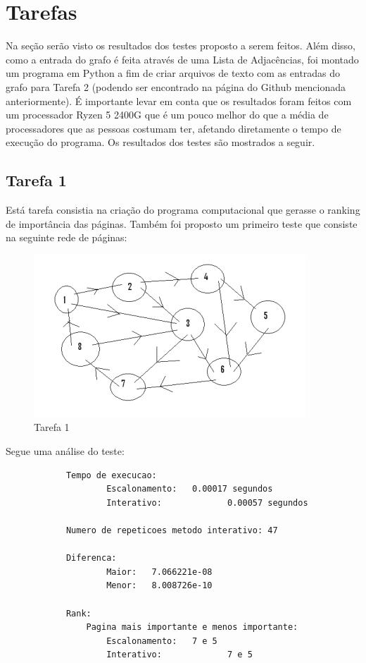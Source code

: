\documentclass[12pt]{article}
\begin{document}
\vspace{3em}

\section{Tarefas}
	Na seção serão visto os resultados dos testes proposto a serem feitos. Além disso, como a entrada do grafo é feita através de uma Lista de Adjacências, foi montado um programa em Python a fim de criar arquivos de texto com as entradas do grafo para Tarefa 2 (podendo ser encontrado na página do Github mencionada anteriormente). É importante levar em conta que os resultados foram feitos com um processador Ryzen 5 2400G que é um pouco melhor do que a média de processadores que as pessoas costumam ter, afetando diretamente o tempo de execução do programa. Os resultados dos testes são mostrados a seguir.
	
	\subsection{Tarefa 1}
		Está tarefa consistia na criação do programa computacional que gerasse o ranking de importância das páginas. Também foi proposto um primeiro teste que consiste na seguinte rede de páginas:
		
		\begin{figure}[h]
  			\centering
  			\includegraphics[width=0.45\linewidth]{t_1_exemplo.png}
  			\caption{Tarefa 1} \label{fig:M1}
		\end{figure}	 
		Segue uma análise do teste:\\
		
		\begin{lstlisting}
			Tempo de execucao:
		 			Escalonamento: 	 0.00017 segundos
		 			Interativo: 	 	 	0.00057 segundos 

			Numero de repeticoes metodo interativo: 47 

			Diferenca: 
		 			Maior: 	 7.066221e-08
		 			Menor: 	 8.008726e-10 

			Rank: 
		 		Pagina mais importante e menos importante:
		 	 		Escalonamento: 	 7 e 5
		 	 		Interativo: 	 	 	7 e 5
		\end{lstlisting}
		
\end{document}
